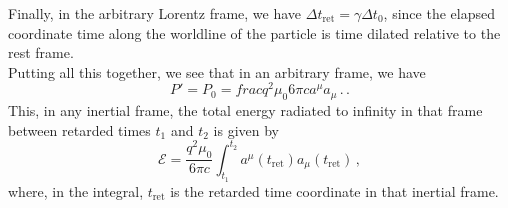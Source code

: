 Finally, in the arbitrary Lorentz frame, we have $\Delta t_\text{ret} = \gamma \Delta t_0$, since the elapsed coordinate time along the worldline of the particle is time dilated relative to the rest frame. \\
Putting all this together, we see that in an arbitrary frame, we have
\begin{equation}\label{eq:Wald_08.123}
P' = P_0  = frac{q^2 \mu_0}{6 \pi c} a^\mu a_\mu \,.            \,. 
\end{equation}
This, in any inertial frame, the total energy radiated to infinity in that frame between retarded times $t_1$ and $t_2$ is given by 
\begin{equation}\label{eq:Wald_08.124}
\mathcal{E} = \frac{q^2 \mu_0}{6 \pi c} \int_{t_1}^{t_2} a^\mu(t_\text{ret}) a_\mu(t_\text{ret}) \,, 
\end{equation}
where, in the integral, $t_\text{ret}$ is the retarded time coordinate in that inertial frame.




 





